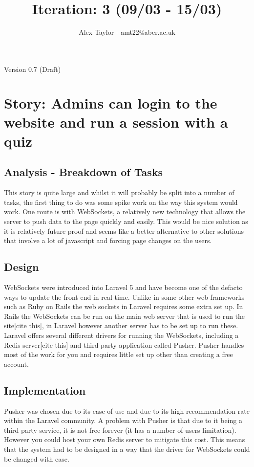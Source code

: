 \documentclass{article}
\title{Iteration: 3 (09/03 - 15/03)}
\author{Alex Taylor - amt22@aber.ac.uk}
\begin{document}
\maketitle
\begin{center}
	Version 0.7 (Draft)
\end{center}
\tableofcontents
\thispagestyle{empty}
\newpage

\section{Story: Admins can login to the website and run a session with a quiz}
\subsection{Analysis - Breakdown of Tasks}
This story is quite large and whilst it will probably be split into a number of tasks, the first thing to do was some spike work on the way this system would work. One route is with WebSockets, a relatively new technology that allows the server to push data to the page quickly and easily. This would be nice solution as it is relatively future proof and seems like a better alternative to other solutions that involve a lot of javascript and forcing page changes on the users.
\subsection{Design}
WebSockets were introduced into Laravel 5 and have become one of the defacto ways to update the front end in real time. Unlike in some other web frameworks such as Ruby on Rails the web sockets in Laravel requires some extra set up. In Rails the WebSockets can be run on the main web server that is used to run the site[cite this], in Laravel however another server has to be set up to run these. Laravel offers several different drivers for running the WebSockets, including a Redis server[cite this] and  third party application called Pusher. Pusher handles most of the work for you and requires little set up other than creating a free account. 
\subsection{Implementation}
Pusher was chosen due to its ease of use and due to its high recommendation rate within the Laravel community. A problem with Pusher is that due to it being a third party service, it is not free forever (it has a number of users limitation). However you could host your own Redis server to mitigate this cost. This means that the system had to be designed in a way that the driver for WebSockets could be changed with ease.
\end{document}
